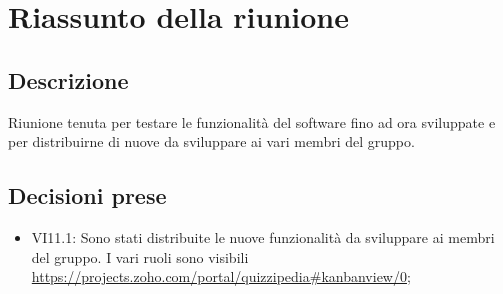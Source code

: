 \section{Riassunto della riunione}
\subsection{Descrizione}

Riunione tenuta per testare le funzionalità del software fino ad ora sviluppate e per distribuirne di nuove da sviluppare ai vari membri del gruppo.

\subsection{Decisioni prese}
\begin{itemize}
\item VI11.1: Sono stati distribuite le nuove funzionalità da sviluppare ai membri del gruppo. I vari ruoli sono visibili  \url{https://projects.zoho.com/portal/quizzipedia#kanbanview/0};
\end{itemize}
